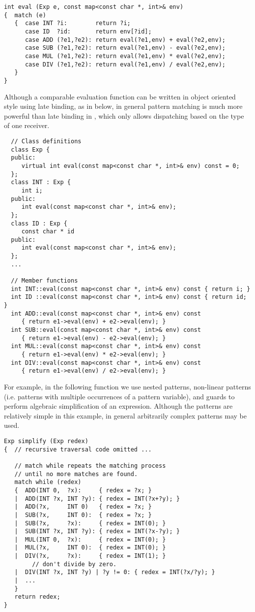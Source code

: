 \begin{verbatim}
int eval (Exp e, const map<const char *, int>& env)
{  match (e)
   {  case INT ?i:        return ?i;
      case ID  ?id:       return env[?id];
      case ADD (?e1,?e2): return eval(?e1,env) + eval(?e2,env);
      case SUB (?e1,?e2): return eval(?e1,env) - eval(?e2,env);
      case MUL (?e1,?e2): return eval(?e1,env) * eval(?e2,env);
      case DIV (?e1,?e2): return eval(?e1,env) / eval(?e2,env);
   }
}
\end{verbatim}
 
 
  Although a comparable evaluation function can be written
in object oriented style using late binding, as in below, in general pattern
matching is much more powerful than late binding in \Cpp, which only
allows dispatching based on the type of one receiver.
 
\begin{verbatim}
  // Class definitions
  class Exp {
  public:
     virtual int eval(const map<const char *, int>& env) const = 0;
  };
  class INT : Exp {
     int i;
  public:
     int eval(const map<const char *, int>& env);
  };
  class ID : Exp {
     const char * id
  public:
     int eval(const map<const char *, int>& env);
  };
  ...
 
  // Member functions
  int INT::eval(const map<const char *, int>& env) const { return i; }
  int ID ::eval(const map<const char *, int>& env) const { return id; }
  int ADD::eval(const map<const char *, int>& env) const
     { return e1->eval(env) + e2->eval(env); }
  int SUB::eval(const map<const char *, int>& env) const
     { return e1->eval(env) - e2->eval(env); }
  int MUL::eval(const map<const char *, int>& env) const
     { return e1->eval(env) * e2->eval(env); }
  int DIV::eval(const map<const char *, int>& env) const
     { return e1->eval(env) / e2->eval(env); }
\end{verbatim}

For example, in the following function we use nested patterns,
non-linear patterns (i.e. patterns with multiple occurrences of
a pattern variable), and guards to perform algebraic simplification
of an expression.  Although the patterns are relatively simple in
this example, in general arbitrarily complex patterns may be used.
 
\begin{verbatim}
Exp simplify (Exp redex)
{  // recursive traversal code omitted ...
 
   // match while repeats the matching process
   // until no more matches are found.
   match while (redex)
   {  ADD(INT 0,  ?x):     { redex = ?x; }
   |  ADD(INT ?x, INT ?y): { redex = INT(?x+?y); }
   |  ADD(?x,     INT 0)   { redex = ?x; }
   |  SUB(?x,     INT 0):  { redex = ?x; }
   |  SUB(?x,     ?x):     { redex = INT(0); }
   |  SUB(INT ?x, INT ?y): { redex = INT(?x-?y); }
   |  MUL(INT 0,  ?x):     { redex = INT(0); }
   |  MUL(?x,     INT 0):  { redex = INT(0); }
   |  DIV(?x,     ?x):     { redex = INT(1); }
        // don't divide by zero.
   |  DIV(INT ?x, INT ?y) | ?y != 0: { redex = INT(?x/?y); }
   |  ...
   }
   return redex;
}
\end{verbatim}
 
